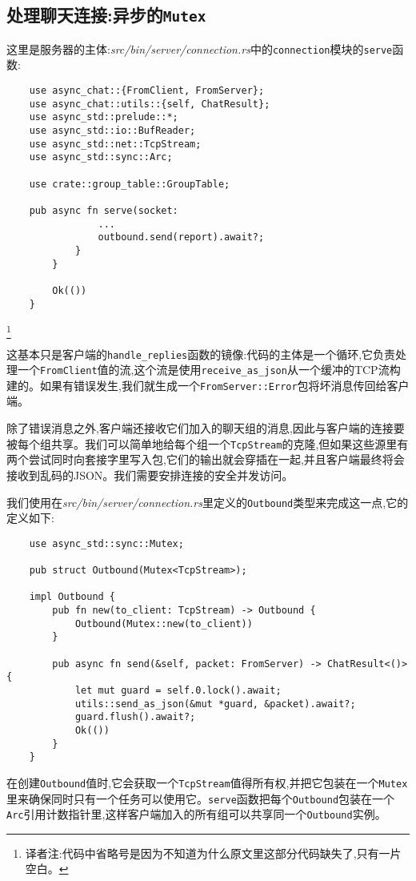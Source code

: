 \subsection{处理聊天连接:异步的\texttt{Mutex}}
这里是服务器的主体:\emph{src/bin/server/connection.rs}中的\texttt{connection}模块的\texttt{serve}函数:
\begin{verbatim}
    use async_chat::{FromClient, FromServer};
    use async_chat::utils::{self, ChatResult};
    use async_std::prelude::*;
    use async_std::io::BufReader;
    use async_std::net::TcpStream;
    use async_std::sync::Arc;

    use crate::group_table::GroupTable;

    pub async fn serve(socket: 
                ...
                outbound.send(report).await?;
            }
        }

        Ok(())
    }
\end{verbatim}
\footnote{译者注:代码中省略号是因为不知道为什么原文里这部分代码缺失了,只有一片空白。}

这基本只是客户端的\texttt{handle\_replies}函数的镜像:代码的主体是一个循环,它负责处理一个\texttt{FromClient}值的流,这个流是使用\texttt{receive\_as\_json}从一个缓冲的TCP流构建的。如果有错误发生,我们就生成一个\texttt{FromServer::Error}包将坏消息传回给客户端。

除了错误消息之外,客户端还接收它们加入的聊天组的消息,因此与客户端的连接要被每个组共享。我们可以简单地给每个组一个\texttt{TcpStream}的克隆,但如果这些源里有两个尝试同时向套接字里写入包,它们的输出就会穿插在一起,并且客户端最终将会接收到乱码的JSON。我们需要安排连接的安全并发访问。

我们使用在\emph{src/bin/server/connection.rs}里定义的\texttt{Outbound}类型来完成这一点,它的定义如下:
\begin{verbatim}
    use async_std::sync::Mutex;

    pub struct Outbound(Mutex<TcpStream>);

    impl Outbound {
        pub fn new(to_client: TcpStream) -> Outbound {
            Outbound(Mutex::new(to_client))
        }

        pub async fn send(&self, packet: FromServer) -> ChatResult<()> {
            let mut guard = self.0.lock().await;
            utils::send_as_json(&mut *guard, &packet).await?;
            guard.flush().await?;
            Ok(())
        }
    }
\end{verbatim}

在创建\texttt{Outbound}值时,它会获取一个\texttt{TcpStream}值得所有权,并把它包装在一个\texttt{Mutex}里来确保同时只有一个任务可以使用它。\texttt{serve}函数把每个\texttt{Outbound}包装在一个\texttt{Arc}引用计数指针里,这样客户端加入的所有组可以共享同一个\texttt{Outbound}实例。

